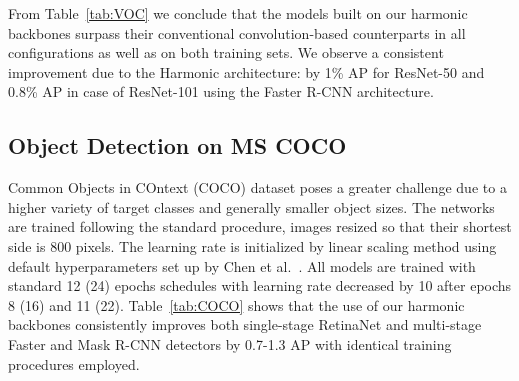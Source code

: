 \documentclass[12pt,a4paper]{article}
\begin{document}
From Table~\ref{tab:VOC} we conclude that the models built on our harmonic backbones surpass their conventional convolution-based counterparts in all configurations as well as on both training sets. 
We observe a consistent improvement due to the Harmonic architecture: by 1\% AP for ResNet-50 and 0.8\% AP in case of ResNet-101 using the Faster R-CNN architecture.



\subsection{Object Detection on MS COCO}\label{sec:segmentation:coco}
Common Objects in COntext (COCO) dataset poses a greater challenge due to a higher variety of target classes and generally smaller object sizes.
The networks are trained following the standard procedure, images resized so that their shortest side is 800 pixels. The learning rate is initialized by linear scaling method  using default hyperparameters set up by Chen et al.~\cite{mmdet}. 
All models are trained with standard 12 (24) epochs schedules with learning rate decreased by 10 after epochs 8 (16) and 11 (22). Table~\ref{tab:COCO} shows that the use of our harmonic backbones consistently improves both single-stage RetinaNet and multi-stage Faster and Mask R-CNN detectors by 0.7-1.3 AP with identical training procedures employed.
\end{document}
